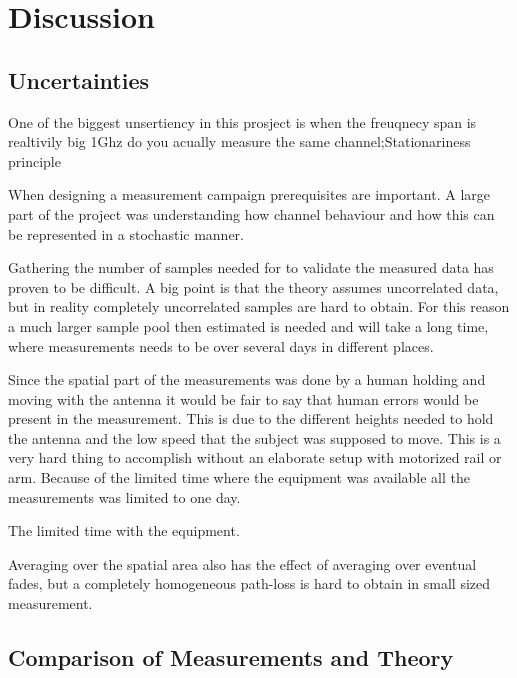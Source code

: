 \chapter{Discussion}
\section{Uncertainties}
One of the biggest unsertiency in this prosject is when the freuqnecy span is realtivily big 1Ghz do you acually measure the same channel;Stationariness principle

When designing a measurement campaign prerequisites are important. A large part of the project was understanding how channel behaviour and how this can be represented in a stochastic manner. 

Gathering the number of samples needed for to validate the measured data has proven to be difficult. A big point is that the theory assumes uncorrelated data, but in reality completely uncorrelated samples are hard to obtain. For this reason a much larger sample pool then estimated is needed and will take a long time, where measurements needs to be over several days in different places.

Since the spatial part of the measurements was done by a human holding and moving with the  antenna it would be fair to say that human errors would be present in the measurement. This is due to the different heights needed to hold the antenna and the low speed that the subject was supposed to move. This is a very hard thing to accomplish without an elaborate setup with motorized rail or arm. Because of the limited time where the equipment was available all the measurements was limited to one day.

The limited time with the equipment.


Averaging over the spatial area also has the effect of averaging over eventual fades, but a completely homogeneous path-loss is hard to obtain in small sized measurement.

\section{Comparison of Measurements and Theory}